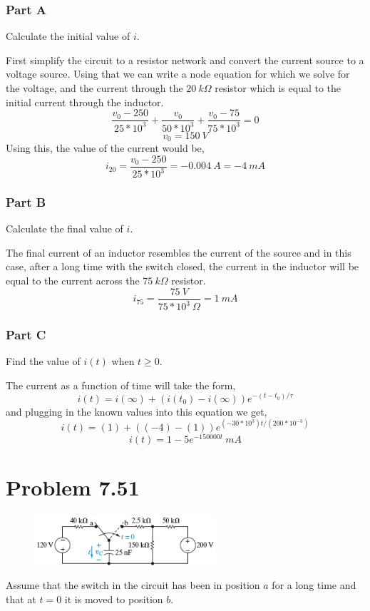 \documentclass[12pt]{article}
\begin{document}
    \subsubsection*{Part A} Calculate the initial value of $ i $. \\
    \par First simplify the circuit to a resistor network and convert the current source to a voltage source. Using that we can write a node equation for which we solve for the voltage, and the current through the $ 20\ k\Omega $ resistor which is equal to the initial current through the inductor.
    \[
        \frac{v_0 - 250}{25 * 10^{3}} + \frac{v_0}{50 * 10^{3}} + \frac{v_0 - 75}{75 * 10^{3}} = 0
    \]
    \[
        v_0 = 150\ V
    \]
    Using this, the value of the current would be,
    \[
        i_{20} = \frac{v_0 - 250}{25 * 10^{3}} = -0.004\ A = \boxed{-4\ mA}
    \]
    \subsubsection*{Part B} Calculate the final value of $ i $. \\
    \par The final current of an inductor resembles the current of the source and in this case, after a long time with the switch closed, the current in the inductor will be equal to the current across the $ 75\ k\Omega $ resistor.
    \[
        i_{75} = \frac{75\ V}{75 * 10^{3}\ \Omega} = \boxed{1\ mA}
    \]
    \subsubsection*{Part C} Find the value of $ i(t) $ when $ t \ge 0 $. \\
    \par The current as a function of time will take the form,
    \[
        i(t) = i(\infty) + (i(t_0) - i(\infty)) e^{-(t - t_0) / \tau}
    \]
    and plugging in the known values into this equation we get,
    \[
        i(t) = (1) + ((-4) - (1)) e^{(-30 * 10^{3}) t / (200 * 10 ^{-3})}
    \]
    \[
        \boxed{i(t) = 1 - 5 e^{-150000t}\ mA}
    \]
    \section*{Problem 7.51}
    \begin{figure}[h]
        \centering
        \includegraphics[width=0.6\textwidth]{7.51 Figure.png}
    \end{figure}
    \par Assume that the switch in the circuit has been in position $ a $ for a long time and that at $ t = 0 $ it is moved to position $ b $.
\end{document}
